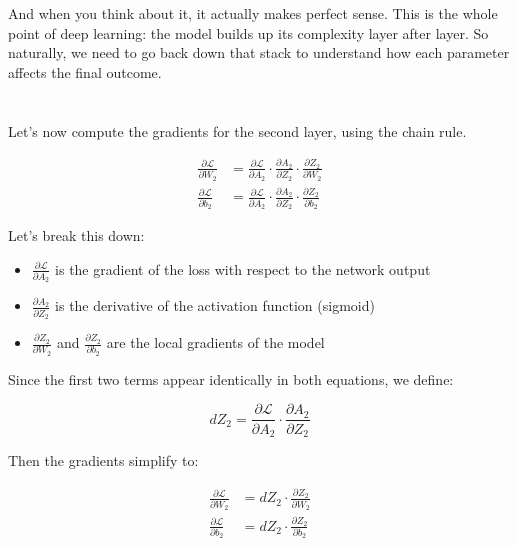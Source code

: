 \documentclass[11pt]{article}
\begin{document}
\vspace{0.5em}

And when you think about it, it actually makes perfect sense.  
This is the whole point of deep learning: the model builds up its complexity layer after layer.  
So naturally, we need to go back down that stack to understand how each parameter affects the final outcome.

\vspace{2em}

\section*{}

Let’s now compute the gradients for the second layer, using the chain rule.

\[
\begin{aligned}
\frac{\partial \mathcal{L}}{\partial W_2} &= 
\frac{\partial \mathcal{L}}{\partial A_2} \cdot 
\frac{\partial A_2}{\partial Z_2} \cdot 
\frac{\partial Z_2}{\partial W_2} \\[1em]
\frac{\partial \mathcal{L}}{\partial b_2} &= 
\frac{\partial \mathcal{L}}{\partial A_2} \cdot 
\frac{\partial A_2}{\partial Z_2} \cdot 
\frac{\partial Z_2}{\partial b_2}
\end{aligned}
\]

Let’s break this down:

\begin{itemize}
    \item $\frac{\partial \mathcal{L}}{\partial A_2}$ is the gradient of the loss with respect to the network output
    \item $\frac{\partial A_2}{\partial Z_2}$ is the derivative of the activation function (sigmoid)
    \item $\frac{\partial Z_2}{\partial W_2}$ and $\frac{\partial Z_2}{\partial b_2}$ are the local gradients of the model
\end{itemize}

\vspace{0.5em}

Since the first two terms appear identically in both equations, we define:

\[
dZ_2 = \frac{\partial \mathcal{L}}{\partial A_2} \cdot \frac{\partial A_2}{\partial Z_2}
\]

Then the gradients simplify to:

\[
\begin{aligned}
\frac{\partial \mathcal{L}}{\partial W_2} &= dZ_2 \cdot \frac{\partial Z_2}{\partial W_2} \\
\frac{\partial \mathcal{L}}{\partial b_2} &= dZ_2 \cdot \frac{\partial Z_2}{\partial b_2}
\end{aligned}
\]
\end{document}
